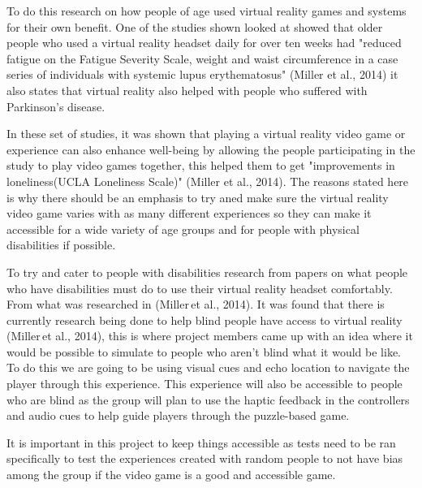 To do this research on how people of age used virtual reality games and systems for their own benefit. One of the studies shown looked at showed that older people who used a virtual reality headset daily for over ten weeks had "reduced fatigue on the Fatigue Severity Scale, weight and waist circumference in a case series of individuals with systemic lupus erythematosus" (Miller et al., 2014) it also states that virtual reality also helped with people who suffered with Parkinson's disease.

In these set of studies, it was shown that playing a virtual reality video game or experience can also enhance well-being by allowing the people participating in the study to play video games together, this helped them to get "improvements in loneliness(UCLA Loneliness Scale)" (Miller et al., 2014). The reasons stated here is why there should be an emphasis to try aned make sure the virtual reality video game varies with as many different experiences so they can make it accessible for a wide variety of age groups and for people with physical disabilities if possible.

To try and cater to people with disabilities research from papers on what people who have disabilities must do to use their virtual reality headset comfortably. From what was researched in (Miller et al., 2014). It was found that there is currently research being done to help blind people have access to virtual reality (Miller et al., 2014), this is where project members came up with an idea where it would be possible to simulate to people who aren’t blind what it would be like. To do this we are going to be using visual cues and echo location to navigate the player through this experience. This experience will also be accessible to people who are blind as the group will plan to use the haptic feedback in the controllers and audio cues to help guide players through the puzzle-based game.  

It is important in this project to keep things accessible as tests need to be ran specifically to test the experiences created with random people to not have bias among the group if the video game is a good and accessible game. 

